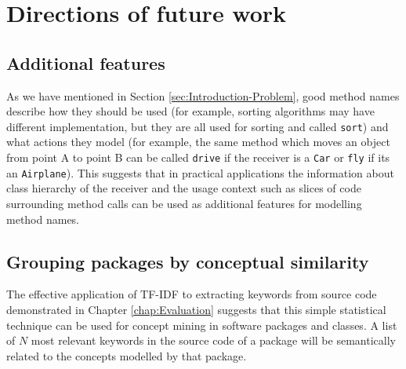 \section{Directions of future work}

\subsection{Additional features}

As we have mentioned in  Section \ref{sec:Introduction-Problem}, good method names describe how they should be used (for example, sorting algorithms may have different implementation, but they are all used for sorting and called \texttt{sort}) and what actions they model (for example, the same method which moves an object from point A to point B can be called \texttt{drive} if the receiver is a \texttt{Car} or \texttt{fly} if its an \texttt{Airplane}). This suggests that in practical applications the information about class hierarchy of the receiver and the usage context such as slices of code surrounding method calls can be used as additional features for modelling method names.

\subsection{Grouping packages by conceptual similarity}
\label{sec:Conclusion-TFIDF}

The effective application of TF-IDF to extracting keywords from source code demonstrated in Chapter \ref{chap:Evaluation} suggests that this simple statistical technique can be used for concept mining in software packages and classes. A list of $N$ most relevant keywords in the source code of a package will be semantically related to the concepts modelled by that package.

